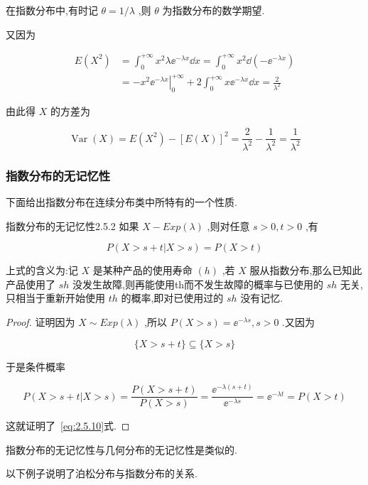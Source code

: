 在指数分布中,有时记 $ \theta=1 / \lambda $ ,则 $ \theta $ 为指数分布的数学期望.

又因为

\[
\begin{aligned} E\left(X^{2}\right) &=\int_{0}^{+\infty} x^{2} \lambda \ee ^{-\lambda x} \dd x=\int_{0}^{+\infty} x^{2} \dd\left(-\ee ^{-\lambda x}\right) \\ &=-x^{2}\left.\ee ^{-\lambda x}\right|_{0} ^{+\infty}+2 \int_{0}^{+\infty} x \ee ^{-\lambda x} \dd x=\frac{2}{\lambda^{2}} \end{aligned}
\]

由此得 $ X $ 的方差为

\[
\operatorname{Var}(X)=E\left(X^{2}\right)-[E(X)]^{2}=\frac{2}{\lambda^{2}}-\frac{1}{\lambda^{2}}=\frac{1}{\lambda^{2}}
\]

\subsubsection{指数分布的无记忆性}

下面给出指数分布在连续分布类中所特有的一个性质.

\begin{theorem}{指数分布的无记忆性}{2.5.2}
	如果 $ X-E x p(\lambda) $ ,则对任意 $ s>0,t>0 $ ,有
	
	\begin{equation}
	P(X>s+t | X>s)=P(X>t) \label{eq:2.5.10}
	\end{equation}
\end{theorem}

上式的含义为:记 $ X $ 是某种产品的使用寿命 $ (h) $ ,若 $ X $ 服从指数分布,那么已知此产品使用了 $ sh $ 没发生故障,则再能使用th而不发生故障的概率与已使用的 $ sh $ 无关,只相当于重新开始使用 $ th $ 的概率,即对已使用过的 $ sh $ 没有记忆.

\begin{proof}
	证明因为 $ X \sim E x p(\lambda) $ ,所以 $ P(X>s)=\ee ^{-\lambda s}, s>0 $ .又因为
	
	\[
	\{X>s+t\} \subseteq\{X>s\}
	\]
	
	于是条件概率
	
	\[
	P(X>s+t | X>s)=\frac{P(X>s+t)}{P(X>s)}=\frac{\ee ^{-\lambda(s+t)}}{\ee ^{-\lambda s}}=\ee ^{-\lambda t}=P(X>t)
	\]
	
	这就证明了~\ref{eq:2.5.10}式.
\end{proof}

指数分布的无记忆性与几何分布的无记忆性是类似的.

以下例子说明了泊松分布与指数分布的关系.

